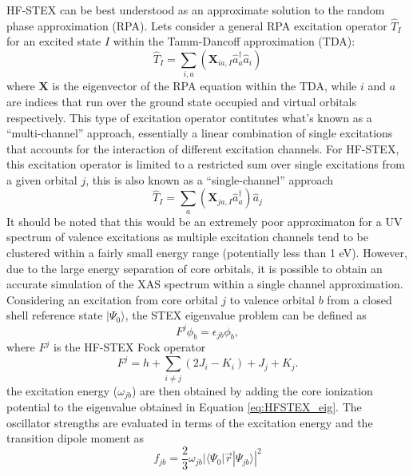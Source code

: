 \documentclass[final]{emory}
\begin{document}
HF-STEX can be best understood as an approximate solution to the random phase approximation (RPA).  Lets consider a general RPA excitation operator $\hat{T}_I$ for an excited state $I$ within the Tamm-Dancoff approximation (TDA):
\begin{equation}
\hat{T}_I = \sum_{i,a} (\mathbf{X}_{ia,I}\hat{a}^{\dagger}_{a}\hat{a}_i)
\end{equation}
where $\mathbf{X}$ is the eigenvector of the RPA equation within the TDA, while $i$ and $a$ are indices that run over the ground state occupied and virtual orbitals respectively. This type of excitation operator contitutes what's known as a ``multi-channel'' approach, essentially a linear combination of single excitations that accounts for the interaction of different excitation channels. For HF-STEX, this excitation operator is limited to a restricted sum over single excitations from a given orbital $j$, this is also known as a ``single-channel'' approach
\begin{equation}
\hat{T}_I = \sum_{a} (\mathbf{X}_{ja,I}\hat{a}^{\dagger}_{a})\hat{a}_j
\end{equation}
It should be noted that this would be an extremely poor approximaton for a UV spectrum of valence excitations as multiple excitation channels tend to be clustered within a fairly small energy range (potentially less than 1 eV). However, due to the large energy separation of core orbitals, it is possible to obtain an accurate simulation of the XAS spectrum within a single channel approximation. Considering an excitation from core orbital $j$ to valence orbital $b$ from a closed shell reference state $|\Psi_0\rangle$, the STEX eigenvalue problem can be defined as
\begin{equation}
\label{eq:HFSTEX_eig}
F^j \phi_b = \epsilon_{jb} \phi_b,
\end{equation}
where $F^j$ is the HF-STEX Fock operator
\begin{equation}
F^j = h + \sum_{i \neq j} (2J_i - K_i) + J_j + K_j.
\end{equation}
the excitation energy ($\omega_{jb}$) are then obtained by adding the core ionization potential to the eigenvalue obtained in Equation \ref{eq:HFSTEX_eig}. The oscillator strengths are evaluated in terms of the excitation energy and the transition dipole moment as
\begin{equation}
f_{jb} = \frac{2}{3} \omega_{jb}|\langle \Psi_0|\vec{r}|\Psi_{jb}\rangle|^2
\end{equation}
\end{document}
